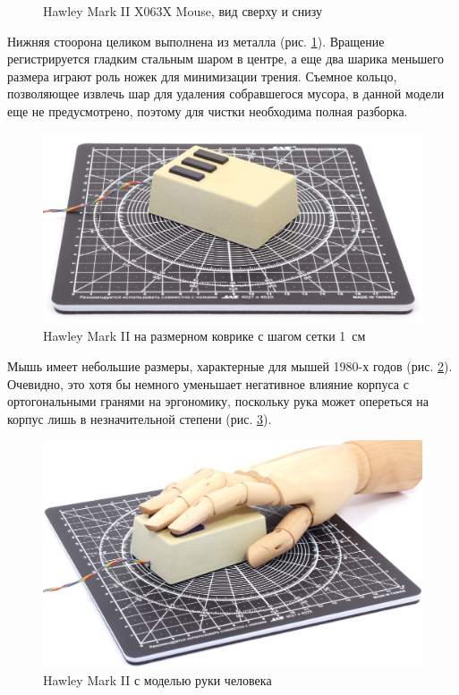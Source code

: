 \documentclass[11pt, a4paper]{article}
\begin{document}
\begin{figure}[h]
    \caption{Hawley Mark II X063X Mouse, вид сверху и снизу}
    \label{fig:HawleyMarkIITopAndBottom}
\end{figure}



Нижняя стоорона целиком выполнена из металла (рис. \ref{fig:HawleyMarkIITopAndBottom}). Вращение регистрируется гладким стальным шаром в центре, а еще два шарика меньшего размера играют роль ножек для минимизации трения. Съемное кольцо, позволяющее извлечь шар для удаления собравшегося мусора, в данной модели еще не предусмотрено, поэтому для чистки необходима полная разборка.

\begin{figure}[h]
    \centering
    \includegraphics[scale=0.5]{1983_hawley_mark_ii/size_30.jpg}
    \caption{Hawley Mark II на размерном коврике с шагом сетки 1~см}
    \label{fig:HawleyMarkIISize}
\end{figure}

Мышь имеет небольшие размеры, характерные для мышей 1980-х годов (рис. \ref{fig:HawleyMarkIISize}). Очевидно, это хотя бы немного уменьшает негативное влияние корпуса с ортогональными гранями на эргономику, поскольку рука может опереться на корпус лишь в незначительной степени (рис. \ref{fig:HawleyMarkIIHand}).

\begin{figure}[h]
    \centering
    \includegraphics[scale=0.5]{1983_hawley_mark_ii/hand_60.jpg}
    \caption{Hawley Mark II с моделью руки человека}
    \label{fig:HawleyMarkIIHand}
\end{figure}
\end{document}
